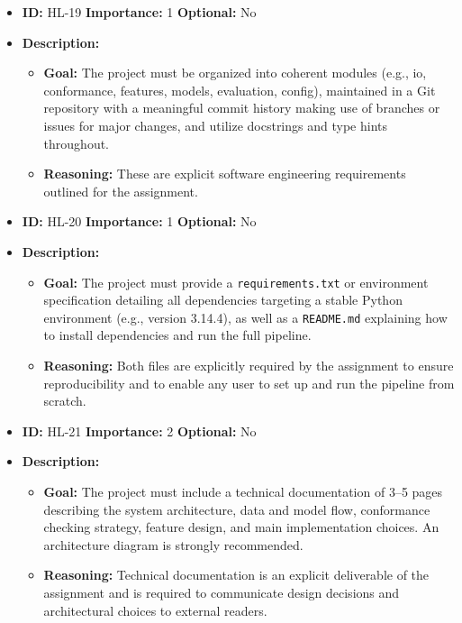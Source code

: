 \documentclass[12pt,a4paper]{article}
\begin{document}
\begin{itemize}
    \item \textbf{ID:} HL-19
 \textbf{Importance:} 1
 \textbf{Optional:} No
    \item \textbf{Description:}
    \begin{itemize}
        \item \textbf{Goal:} The project must be organized into coherent modules (e.g., io, conformance, features, models, evaluation, config), maintained in a Git repository with a meaningful commit history making use of branches or issues for major changes, and utilize docstrings and type hints throughout.
        \item \textbf{Reasoning:} These are explicit software engineering requirements outlined for the assignment.
    \end{itemize}
\end{itemize}
\vspace{1.5em}

\begin{itemize}
    \item \textbf{ID:} HL-20
 \textbf{Importance:} 1
 \textbf{Optional:} No
    \item \textbf{Description:}
    \begin{itemize}
        \item \textbf{Goal:} The project must provide a \texttt{requirements.txt} or environment specification detailing all dependencies targeting a stable Python environment (e.g., version 3.14.4), as well as a \texttt{README.md} explaining how to install dependencies and run the full pipeline.
        \item \textbf{Reasoning:} Both files are explicitly required by the assignment to ensure reproducibility and to enable any user to set up and run the pipeline from scratch.
    \end{itemize}
\end{itemize}
\vspace{1.5em}

\begin{itemize}
    \item \textbf{ID:} HL-21
 \textbf{Importance:} 2
 \textbf{Optional:} No
    \item \textbf{Description:}
    \begin{itemize}
        \item \textbf{Goal:} The project must include a technical documentation of 3--5 pages describing the system architecture, data and model flow, conformance checking strategy, feature design, and main implementation choices. An architecture diagram is strongly recommended.
        \item \textbf{Reasoning:} Technical documentation is an explicit deliverable of the assignment and is required to communicate design decisions and architectural choices to external readers.
    \end{itemize}
\end{itemize}
\vspace{1.5em}
\end{document}
